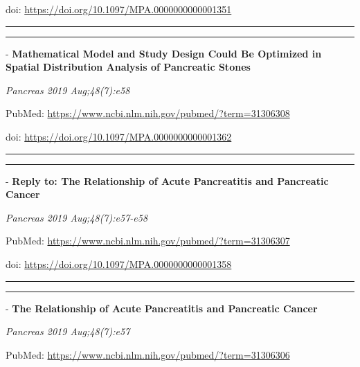 \documentclass[]{article}
\begin{document}
doi: \url{https://doi.org/10.1097/MPA.0000000000001351}

{}

{}

\begin{center}\rule{0.5\linewidth}{\linethickness}\end{center}

\begin{center}\rule{0.5\linewidth}{\linethickness}\end{center}

 - \textbf{Mathematical Model and Study Design Could Be Optimized in
Spatial Distribution Analysis of Pancreatic Stones}

\emph{Pancreas 2019 Aug;48(7):e58}

PubMed: \url{https://www.ncbi.nlm.nih.gov/pubmed/?term=31306308}

doi: \url{https://doi.org/10.1097/MPA.0000000000001362}

{}

{}

\begin{center}\rule{0.5\linewidth}{\linethickness}\end{center}

\begin{center}\rule{0.5\linewidth}{\linethickness}\end{center}

 - \textbf{Reply to: The Relationship of Acute Pancreatitis and
Pancreatic Cancer}

\emph{Pancreas 2019 Aug;48(7):e57-e58}

PubMed: \url{https://www.ncbi.nlm.nih.gov/pubmed/?term=31306307}

doi: \url{https://doi.org/10.1097/MPA.0000000000001358}

{}

{}

\begin{center}\rule{0.5\linewidth}{\linethickness}\end{center}

\begin{center}\rule{0.5\linewidth}{\linethickness}\end{center}

 - \textbf{The Relationship of Acute Pancreatitis and Pancreatic Cancer}

\emph{Pancreas 2019 Aug;48(7):e57}

PubMed: \url{https://www.ncbi.nlm.nih.gov/pubmed/?term=31306306}
\end{document}
